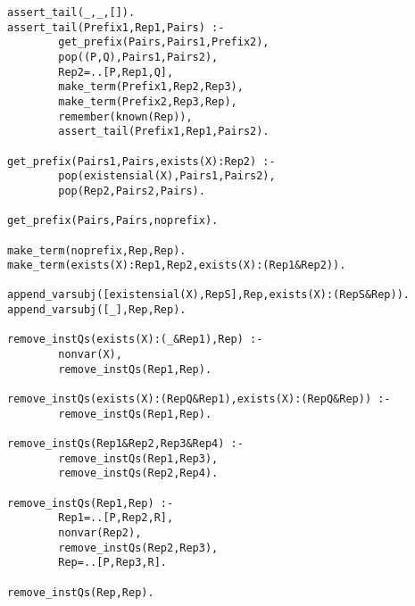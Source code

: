 \begin{verbatim}
assert_tail(_,_,[]).
assert_tail(Prefix1,Rep1,Pairs) :-
        get_prefix(Pairs,Pairs1,Prefix2),
        pop((P,Q),Pairs1,Pairs2),
        Rep2=..[P,Rep1,Q],
        make_term(Prefix1,Rep2,Rep3),
        make_term(Prefix2,Rep3,Rep),
        remember(known(Rep)),
        assert_tail(Prefix1,Rep1,Pairs2).

get_prefix(Pairs1,Pairs,exists(X):Rep2) :-
        pop(existensial(X),Pairs1,Pairs2),
        pop(Rep2,Pairs2,Pairs).

get_prefix(Pairs,Pairs,noprefix).

make_term(noprefix,Rep,Rep).
make_term(exists(X):Rep1,Rep2,exists(X):(Rep1&Rep2)).

append_varsubj([existensial(X),RepS],Rep,exists(X):(RepS&Rep)).
append_varsubj([_],Rep,Rep).

remove_instQs(exists(X):(_&Rep1),Rep) :- 
        nonvar(X),
        remove_instQs(Rep1,Rep).

remove_instQs(exists(X):(RepQ&Rep1),exists(X):(RepQ&Rep)) :- 
        remove_instQs(Rep1,Rep).

remove_instQs(Rep1&Rep2,Rep3&Rep4) :-
        remove_instQs(Rep1,Rep3),
        remove_instQs(Rep2,Rep4).

remove_instQs(Rep1,Rep) :-
        Rep1=..[P,Rep2,R],
        nonvar(Rep2),
        remove_instQs(Rep2,Rep3),
        Rep=..[P,Rep3,R].

remove_instQs(Rep,Rep).
\end{verbatim}
